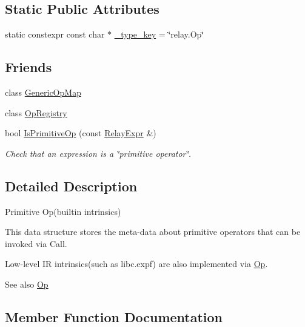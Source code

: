 \subsection*{Static Public Attributes}
\begin{DoxyCompactItemize}
\item 
static constexpr const char $\ast$ \hyperlink{classtvm_1_1OpNode_a2c50dc0d1b84d52d6da19a6fa3fcabac}{\+\_\+type\+\_\+key} = \char`\"{}relay.\+Op\char`\"{}
\end{DoxyCompactItemize}
\subsection*{Friends}
\begin{DoxyCompactItemize}
\item 
class \hyperlink{classtvm_1_1OpNode_a296d487cd2e3438353e759571270be97}{Generic\+Op\+Map}
\item 
class \hyperlink{classtvm_1_1OpNode_af7ebaf5af32d51226208f533e6d5cb1d}{Op\+Registry}
\item 
bool \hyperlink{classtvm_1_1OpNode_aee9090e54dff3e72ed272b981e036ae6}{Is\+Primitive\+Op} (const \hyperlink{classtvm_1_1RelayExpr}{Relay\+Expr} \&)
\begin{DoxyCompactList}\small\item\em Check that an expression is a \char`\"{}primitive operator\char`\"{}. \end{DoxyCompactList}\end{DoxyCompactItemize}


\subsection{Detailed Description}
Primitive Op(builtin intrinsics) 

This data structure stores the meta-\/data about primitive operators that can be invoked via Call.

Low-\/level IR intrinsics(such as libc.\+expf) are also implemented via \hyperlink{classtvm_1_1Op}{Op}.

\begin{DoxySeeAlso}{See also}
\hyperlink{classtvm_1_1Op}{Op} 
\end{DoxySeeAlso}


\subsection{Member Function Documentation}
